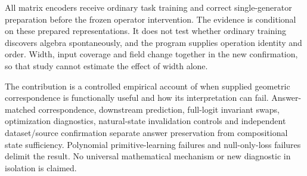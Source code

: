 All matrix encoders receive ordinary task training and correct single-generator preparation before the frozen operator intervention. The evidence is conditional on these prepared representations. It does not test whether ordinary training discovers algebra spontaneously, and the program supplies operation identity and order. Width, input coverage and field change together in the new confirmation, so that study cannot estimate the effect of width alone.

The contribution is a controlled empirical account of when supplied geometric correspondence is functionally useful and how its interpretation can fail. Answer-matched correspondence, downstream prediction, full-logit invariant swaps, optimization diagnostics, natural-state invalidation controls and independent dataset/source confirmation separate answer preservation from compositional state sufficiency. Polynomial primitive-learning failures and null-only-loss failures delimit the result. No universal mathematical mechanism or new diagnostic in isolation is claimed.

